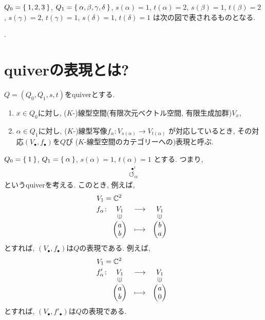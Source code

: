 \begin{example}
  $Q_0=\Set{1,2,3}$,
  $Q_1=\Set{\alpha,\beta,\gamma,\delta}$,
  $s(\alpha)=1$,
  $t(\alpha)=2$,
  $s(\beta)=1$,
  $t(\beta)=2$,
  $s(\gamma)=2$,
  $t(\gamma)=1$,
  $s(\delta)=1$,
  $t(\delta)=1$
  は次の図で表されるものとなる.
  \begin{center}
    .
  \end{center}
\end{example}



\section{quiverの表現とは?}
$Q=(Q_0,Q_1,s,t)$をquiverとする.
\begin{enumerate}
\item
  $x\in Q_0$に対し,
  ($K$-)線型空間(有限次元ベクトル空間, 有限生成加群)$V_x$,
\item
  $\alpha\in Q_1$に対し,
  ($K$-)線型写像$f_\alpha\colon V_{s(\alpha)} \to V_{t(\alpha)}$
  が対応しているとき,
  その対応$(V_\bullet,f_\bullet)$を$Q$び
  ($K$-線型空間のカテゴリーへの)表現と呼ぶ.
\end{enumerate}

\begin{example}
  $Q_0=\Set{1}$,
  $Q_1=\Set{\alpha}$,
  $s(\alpha)=1$,
  $t(\alpha)=1$
  とする.
  つまり,
  \begin{align*}
    \stackrel{\bullet^{1}}{\circlearrowleft_{\alpha}}
  \end{align*}
  というquiverを考える.
  このとき,
  例えば,
  \begin{align*}
    V_1&=\CC^2\\
    f_\alpha&\colon
    \Shazo{V_1}{V_1}
    {\begin{pmatrix}a\\b\end{pmatrix}}
    {\begin{pmatrix}b\\a\end{pmatrix}}
  \end{align*}
  とすれば,
  $(V_\bullet,f_\bullet)$は$Q$の表現である.
  例えば,
  \begin{align*}
    V_1&=\CC^2\\
    f'_\alpha&\colon
    \Shazo{V_1}{V_1}
    {\begin{pmatrix}a\\b\end{pmatrix}}
    {\begin{pmatrix}a\\0\end{pmatrix}}
  \end{align*}
  とすれば,
  $(V_\bullet,f'_\bullet)$は$Q$の表現である.
\end{example}

